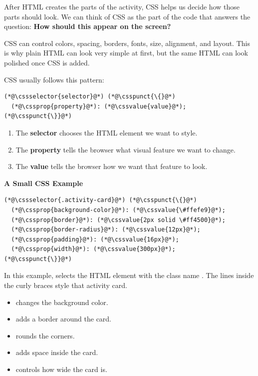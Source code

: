 \documentclass{article}
\begin{document}
After HTML creates the parts of the activity, CSS helps us decide how those parts should look.
We can think of CSS as the part of the code that answers the question:
\textbf{How should this appear on the screen?}

CSS can control colors, spacing, borders, fonts, size, alignment, and layout.
This is why plain HTML can look very simple at first, but the same HTML can look polished once CSS is added.

\vspace{0.2cm}

CSS usually follows this pattern:

\begin{lstlisting}
(*@\cssselector{selector}@*) (*@\csspunct{\{}@*)
  (*@\cssprop{property}@*): (*@\cssvalue{value}@*);
(*@\csspunct{\}}@*)
\end{lstlisting}

\begin{enumerate}
  \item The \textbf{selector} chooses the HTML element we want to style.
  \item The \textbf{property} tells the browser what visual feature we want to change.
  \item The \textbf{value} tells the browser how we want that feature to look.
\end{enumerate}

\vspace{0.3cm}

\textbf{\Bitter\textcolor{naranja}{A Small CSS Example}}

\vspace{0.1cm}

\begin{lstlisting}
(*@\cssselector{.activity-card}@*) (*@\csspunct{\{}@*)
  (*@\cssprop{background-color}@*): (*@\cssvalue{\#ffefe9}@*);
  (*@\cssprop{border}@*): (*@\cssvalue{2px solid \#ff4500}@*);
  (*@\cssprop{border-radius}@*): (*@\cssvalue{12px}@*);
  (*@\cssprop{padding}@*): (*@\cssvalue{16px}@*);
  (*@\cssprop{width}@*): (*@\cssvalue{300px}@*);
(*@\csspunct{\}}@*)
\end{lstlisting}

In this example,  selects the HTML element with the class name .
The lines inside the curly braces style that activity card.

\begin{itemize}[leftmargin=1.2cm, itemsep=4pt]
  \item {} changes the background color.
  \item {} adds a border around the card.
  \item {} rounds the corners.
  \item {} adds space inside the card.
  \item {} controls how wide the card is.
\end{itemize}
\end{document}
